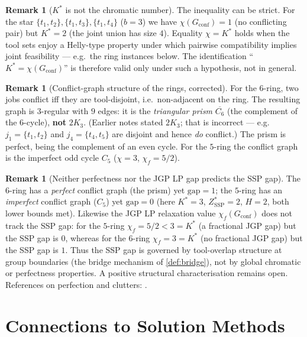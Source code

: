 \documentclass[11pt,a4paper]{article}
\theoremstyle{plain}
\theoremstyle{definition}
\newtheorem{remark}[theorem]{Remark}
\newcommand{\Kstar}{K^{*}}
\newcommand{\ZSSP}{Z_{\mathrm{SSP}}^{*}}
\begin{document}
\begin{remark}[$\Kstar$ is not the chromatic number]
The inequality can be strict. For the star $\{t_1,t_2\},\{t_1,t_3\},\{t_1,t_4\}$ ($b=3$)
we have $\chi(G_{\mathrm{conf}})=1$ (no conflicting pair) but $\Kstar=2$ (the joint union
has size $4$). Equality $\chi=\Kstar$ holds when the tool sets enjoy a Helly-type property
under which pairwise compatibility implies joint feasibility --- e.g.\ the ring instances
below. The identification ``$\Kstar=\chi(G_{\mathrm{conf}})$'' is therefore valid only
under such a hypothesis, not in general.
\end{remark}

\begin{remark}[Conflict-graph structure of the rings, corrected]
\label{rem:ringconf}
For the $6$-ring, two jobs conflict iff they are tool-disjoint, i.e.\ non-adjacent on the
ring. The resulting graph is $3$-regular with $9$ edges: it is the \emph{triangular prism}
$\overline{C_6}$ (the complement of the $6$-cycle), \textbf{not} $2K_3$. (Earlier notes
stated $2K_3$; that is incorrect --- e.g.\ $j_1=\{t_1,t_2\}$ and $j_4=\{t_4,t_5\}$ are
disjoint and hence \emph{do} conflict.) The prism is perfect, being the complement of an
even cycle. For the $5$-ring the conflict graph is the imperfect odd cycle $C_5$
($\chi=3$, $\chi_f=5/2$).
\end{remark}

\begin{remark}[Neither perfectness nor the JGP LP gap predicts the SSP gap]
\label{rem:independence}
The $6$-ring has a \emph{perfect} conflict graph (the prism) yet $\mathrm{gap}=1$; the
$5$-ring has an \emph{imperfect} conflict graph ($C_5$) yet $\mathrm{gap}=0$
(here $\Kstar=3$, $\ZSSP=2$, $H=2$, both lower bounds met). Likewise the JGP LP relaxation
value $\chi_f(G_{\mathrm{conf}})$ does not track the SSP gap: for the $5$-ring
$\chi_f=5/2<3=\Kstar$ (a fractional JGP gap) but the SSP gap is $0$, whereas for the
$6$-ring $\chi_f=3=\Kstar$ (no fractional JGP gap) but the SSP gap is $1$. Thus the SSP
gap is governed by tool-overlap structure at group boundaries (the bridge mechanism of
\cref{def:bridge}), not by global chromatic or perfectness properties. A positive
structural characterisation remains open. References on perfection and clutters:
\cite{Chudnovsky2006,Cornuejols2001}.
\end{remark}

\section{Connections to Solution Methods}
\label{sec:connections}
\end{document}
